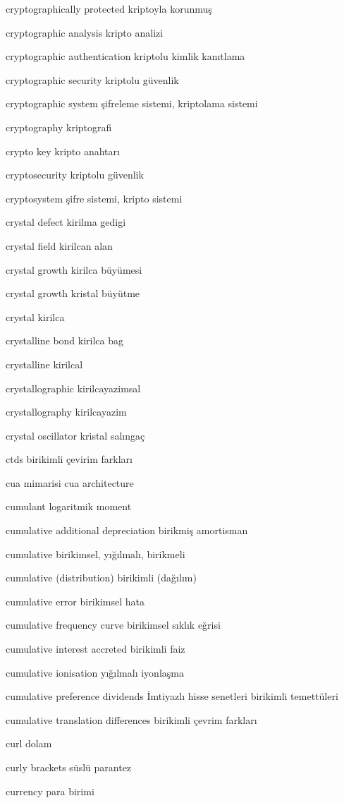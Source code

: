\documentclass[12pt,fleqn]{article}\usepackage{../../common}
\begin{document}
cryptographically protected kriptoyla korunmuş

cryptographic analysis kripto analizi

cryptographic authentication kriptolu kimlik kanıtlama

cryptographic security kriptolu güvenlik

cryptographic system şifreleme sistemi, kriptolama sistemi

cryptography kriptografi

crypto key kripto anahtarı

cryptosecurity kriptolu güvenlik

cryptosystem şifre sistemi, kripto sistemi

crystal defect kirilma gedigi

crystal field kirilcan alan

crystal growth kirilca büyümesi

crystal growth kristal büyütme

crystal kirilca

crystalline bond kirilca bag

crystalline kirilcal

crystallographic kirilcayazimsal

crystallography kirilcayazim

crystal oscillator kristal salıngaç

ctds birikimli çevirim farkları

cua mimarisi cua architecture

cumulant logaritmik moment

cumulative additional depreciation birikmiş amortisman

cumulative birikimsel, yığılmalı, birikmeli

cumulative (distribution) birikimli (dağılım)

cumulative error birikimsel hata

cumulative frequency curve birikimsel sıklık eğrisi

cumulative interest accreted birikimli faiz

cumulative ionisation yığılmalı iyonlaşma

cumulative preference dividends İmtiyazlı hisse senetleri birikimli temettüleri

cumulative translation differences birikimli çevrim farkları

curl dolam

curly brackets süslü parantez

currency para birimi
\end{document}
